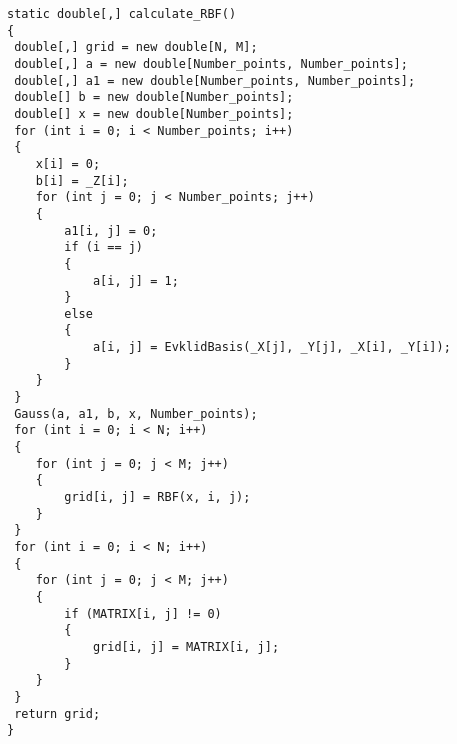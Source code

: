 \begin{lstlisting}[caption={Метод интерполяции с помощью радиально-базисной функции}, label={ls:a:02}]
static double[,] calculate_RBF()
{
 double[,] grid = new double[N, M];
 double[,] a = new double[Number_points, Number_points];
 double[,] a1 = new double[Number_points, Number_points];
 double[] b = new double[Number_points];
 double[] x = new double[Number_points];
 for (int i = 0; i < Number_points; i++)
 {
    x[i] = 0;
    b[i] = _Z[i];
    for (int j = 0; j < Number_points; j++)
    {
        a1[i, j] = 0;
        if (i == j)
        {
            a[i, j] = 1;
        }
        else
        {
            a[i, j] = EvklidBasis(_X[j], _Y[j], _X[i], _Y[i]);
        }
    }
 }
 Gauss(a, a1, b, x, Number_points);
 for (int i = 0; i < N; i++)
 {
    for (int j = 0; j < M; j++)
    {
        grid[i, j] = RBF(x, i, j);
    }
 }
 for (int i = 0; i < N; i++)
 {
    for (int j = 0; j < M; j++)
    {
        if (MATRIX[i, j] != 0)
        {
            grid[i, j] = MATRIX[i, j];
        }
    }
 }
 return grid;
}
\end{lstlisting}
